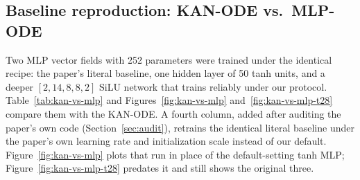 \subsection{Baseline reproduction: KAN-ODE vs.\ MLP-ODE}
\label{sec:kan-vs-mlp}

Two MLP vector fields with 252 parameters were trained under the identical
recipe: the paper's literal baseline, one hidden layer of 50 tanh units, and
a deeper $[2,14,8,8,2]$ SiLU network that trains reliably under our
protocol. Table~\ref{tab:kan-vs-mlp} and Figures~\ref{fig:kan-vs-mlp}
and~\ref{fig:kan-vs-mlp-t28} compare
them with the KAN-ODE. A fourth column, added after auditing the paper's own
code (Section~\ref{sec:audit}), retrains the identical literal baseline under
the paper's own learning rate and initialization scale instead of our
default. Figure~\ref{fig:kan-vs-mlp} plots that run in place of the
default-setting tanh MLP; Figure~\ref{fig:kan-vs-mlp-t28} predates it and
still shows the original three.

